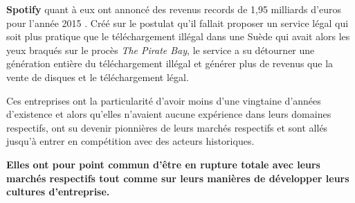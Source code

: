\vspace{5mm}

\textbf{Spotify} quant à eux ont annoncé des revenus records de 1,95 milliards d'euros pour l'année 2015 \supercite{SpotifyChiffres2015}. Créé sur le postulat qu'il fallait proposer un service légal qui soit plus pratique que le téléchargement illégal dans une Suède qui avait alors les yeux braqués sur le procès \textit{The Pirate Bay}, le service a su détourner une génération entière du téléchargement illégal et générer plus de revenus que la vente de disques et le téléchargement légal.

\vspace{5mm}

Ces entreprises ont la particularité d'avoir moins d'une vingtaine d'années d'existence et alors qu'elles n'avaient aucune expérience dans leurs domaines respectifs, ont su devenir pionnières de leurs marchés respectifs et sont allés jusqu'à entrer en compétition avec des acteurs historiques.

\textbf{Elles ont pour point commun d'être en rupture totale avec leurs marchés respectifs tout comme sur leurs manières de développer leurs cultures d'entreprise.}
